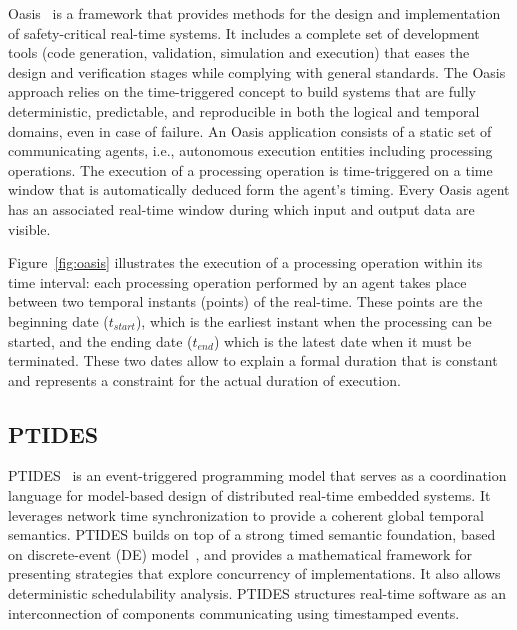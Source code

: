 Oasis~\cite{intro:oasis1,intro:oasis2} is a framework that provides methods for the design 
and implementation of safety-critical real-time systems. It includes a complete set of 
development tools (code generation, validation, simulation and execution) that eases the design 
and verification stages
while complying with general standards. The Oasis approach relies on the time-triggered concept
to build systems that are fully deterministic, predictable, and reproducible in both the logical
and temporal domains, even in case of failure.
An Oasis application consists of a static set of communicating agents, i.e., autonomous execution
entities including processing operations. The execution of a processing operation is 
time-triggered on a time window that is automatically deduced form the agent's timing.
Every Oasis agent has an associated real-time window during which input and output data are 
visible.

Figure~\ref{fig:oasis} illustrates the execution of a processing operation within its time
interval: each processing operation performed by an
agent takes place between two temporal instants (points) of the real-time. 
These points are the beginning date ($t_{start}$), which is the earliest instant
when the processing can be started, and the ending date ($t_{end}$) which is the latest
date when it must be terminated. These two dates allow to explain a formal duration 
that is constant and represents a constraint for the actual duration of execution.


\subsection{PTIDES}
PTIDES~\cite{intro:ptides2} is an event-triggered 
programming model that serves as a coordination language for 
model-based design of distributed real-time embedded systems. 
It leverages network time synchronization to provide a coherent global temporal semantics.
PTIDES builds on top of a strong timed semantic foundation, based on discrete-event (DE)
model~\cite{intro:ptides4}, and provides a mathematical framework
for presenting strategies that explore concurrency of implementations. It also allows 
deterministic schedulability analysis.
PTIDES structures real-time software as an interconnection of components communicating using
timestamped events. 

